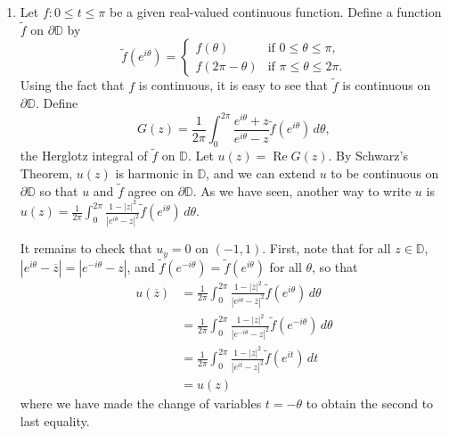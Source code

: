 \documentclass[11pt]{book}
\theoremstyle{definition}
\renewcommand{\Re}{\operatorname{Re}}
\begin{document}
\begin{enumerate}

        \item  Let $f: 0 \leq t \leq \pi$ be a given real-valued continuous function.  Define a function $\widetilde f$ on $\partial \mathbb D$ by
          \[ \widetilde f(e^{i\theta}) = \begin{cases}
              f(\theta) & \text{if $0\leq \theta \leq \pi$,} \\    
              f(2\pi - \theta) & \text{if $\pi \leq \theta \leq 2\pi$.}
            \end{cases}
            \]
            Using the fact that $f$ is continuous, it is easy to see that $\widetilde f$ is continuous on $\partial \mathbb D$.  Define 
            \[ G(z) = \frac{1}{2\pi} \int_0^{2\pi} \frac{e^{i\theta} + z}{e^{i\theta} - z} \widetilde f(e^{i\theta}) \, d\theta ,\]  the Herglotz integral of $\widetilde f$ on $\mathbb D$.  Let $u(z) = \Re G(z)$.  By Schwarz's Theorem, $u(z)$ is harmonic in $\mathbb D$, and we can extend $u$ to be continuous on $\partial \mathbb D$ so that $u$ and $\widetilde f$ agree on $\partial \mathbb D$.  As we have seen, another way to write $u$ is $u(z) = \tfrac{1}{2\pi} \int_0^{2\pi} \frac{1 - |z|^2}{|e^{i\theta} - z|^2} \widetilde f(e^{i\theta}) \, d\theta$. 

            It remains to check that $u_y = 0$ on $(-1,1)$.  First, note that for all $z\in \mathbb D$, $|e^{i\theta} - \overline z| = |e^{-i\theta} - z|$, and $\widetilde f(e^{-i\theta}) = \widetilde f(e^{i\theta})$ for all $\theta$, so that 
            \begin{align*}
              u(\overline z) &= \frac{1}{2\pi} \int_0^{2\pi} \frac{1 - |\overline z|^2}{|e^{i\theta} - \overline z|^2} \widetilde f(e^{i\theta}) \, d\theta \\
              &=  \frac{1}{2\pi} \int_0^{2\pi} \frac{1 - |z|^2}{|e^{-i\theta} - z|^2} \widetilde f(e^{- i\theta}) \, d\theta \\ 
              &=  \frac{1}{2\pi} \int_0^{2\pi} \frac{1 - |z|^2}{|e^{it} - z|^2} \widetilde f(e^{it}) \, dt \\  
              &= u(z)
            \end{align*}
            where we have made the change of variables $t=-\theta$ to obtain the second to last equality.  
            

\end{enumerate}
\end{document}
